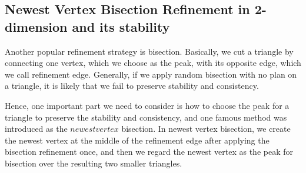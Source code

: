    \subsection{Newest Vertex Bisection Refinement in 2-dimension and its stability}
    Another popular refinement strategy is bisection. Basically, we cut a triangle by connecting one vertex, which we choose as the peak, with its opposite edge, which we call refinement edge. Generally, if we apply random bisection with no plan on a triangle, it is likely that we fail to preserve stability and consistency.

    Hence, one important part we need to consider is how to choose the peak for a triangle to preserve the stability and consistency, and one famous method was introduced as the $newest vertex$ bisection. In newest vertex bisection, we create the newest vertex at the middle of the refinement edge after applying the bisection refinement once, and then we regard the newest vertex as the peak for bisection over the resulting two smaller triangles.

